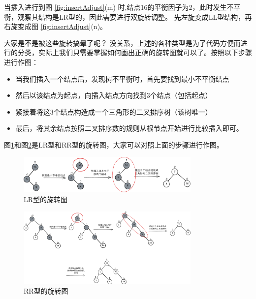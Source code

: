 \documentclass[lang=cn,newtx,10pt,scheme=chinese]{../elegantbook}
\begin{document}
当插入进行到图 \ref{fig:insertAdjust}(m) 时,结点16的平衡因子为2，此时发生不平衡，观察其结构是LR型的，因此需要进行双旋转调整。
先左旋变成LL型结构，再右旋变成图 \ref{fig:insertAdjust}(n)。


大家是不是被这些旋转搞晕了呢？
没关系，上述的各种类型是为了代码方便而进行的分类，实际上我们只需要掌握如何画出正确的旋转图就可以了。按照以下步骤进行作图：

\begin{itemize}
  \item 当我们插入一个结点后，发现树不平衡时，首先要找到最小不平衡结点
  \item 然后以该结点为起点，向插入结点方向找到3个结点（包括起点）
  \item 紧接着将这3个结点构造成一个三角形的二叉排序树（该树唯一）
  \item 最后，将其余结点按照二叉排序数的规则从根节点开始进行比较插入即可。
\end{itemize}

图\ref{fig:banlanceTree_insert_LR}和图\ref{fig:banlanceTree_insert_RR}是LR型和RR型的旋转图，大家可以对照上面的步骤进行作图。
\begin{figure}
  
    \centering
    \includegraphics[width=0.8\textwidth]{./figure/pdf/cropped/balanceTree_insert_LR.pdf}
    \caption{LR型的旋转图}
    \label{fig:banlanceTree_insert_LR}
\end{figure}

\begin{figure}
  
    \centering
    \includegraphics[width=0.8\textwidth]{./figure/pdf/cropped/balanceTree_insert_RR.pdf}
    \caption{RR型的旋转图}
    \label{fig:banlanceTree_insert_RR}

\end{figure}
\end{document}
